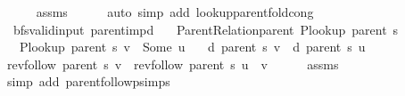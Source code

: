 \begin{isabellebody}
\ \ \ \ \isamarkupfalse%
\ assms\isanewline
\ \ \ \ \isamarkupfalse%
\ {\isacharparenleft}{\kern0pt}auto\ simp\ add{\isacharcolon}{\kern0pt}\ lookup{\isacharunderscore}{\kern0pt}parent{\isacharunderscore}{\kern0pt}fold{\isacharunderscore}{\kern0pt}cong{\isacharparenright}{\kern0pt}\isanewline
{}\isamarkupfalse%
%
\endisatagproof
{\isafoldproof}%
%
\isadelimproof
\isanewline
%
\endisadelimproof
%
\isadeliminvisible
\isanewline
%
\endisadeliminvisible
%
\isataginvisible
{}\isamarkupfalse%
\ {\isacharparenleft}{\kern0pt}\ bfs{\isacharunderscore}{\kern0pt}valid{\isacharunderscore}{\kern0pt}input{\isacharparenright}{\kern0pt}\ parent{\isacharunderscore}{\kern0pt}imp{\isacharunderscore}{\kern0pt}d{\isacharcolon}{\kern0pt}\isanewline
\ \ \ {\isachardoublequoteopen}Parent{\isacharunderscore}{\kern0pt}Relation{\isachardot}{\kern0pt}parent\ {\isacharparenleft}{\kern0pt}P{\isacharunderscore}{\kern0pt}lookup\ {\isacharparenleft}{\kern0pt}parent\ s{\isacharparenright}{\kern0pt}{\isacharparenright}{\kern0pt}{\isachardoublequoteclose}\isanewline
\ \ \ {\isachardoublequoteopen}P{\isacharunderscore}{\kern0pt}lookup\ {\isacharparenleft}{\kern0pt}parent\ s{\isacharparenright}{\kern0pt}\ v\ {\isacharequal}{\kern0pt}\ Some\ u{\isachardoublequoteclose}\isanewline
\ \ \ {\isachardoublequoteopen}d\ {\isacharparenleft}{\kern0pt}parent\ s{\isacharparenright}{\kern0pt}\ v\ {\isacharequal}{\kern0pt}\ d\ {\isacharparenleft}{\kern0pt}parent\ s{\isacharparenright}{\kern0pt}\ u\ {\isacharplus}{\kern0pt}\ {}{\isachardoublequoteclose}%
\endisataginvisible
{\isafoldinvisible}%
%
\isadeliminvisible
\isanewline
%
\endisadeliminvisible
%
\isadelimproof
%
\endisadelimproof
%
\isatagproof
{}\isamarkupfalse%
\ {\isacharminus}{\kern0pt}\isanewline
\ \ \isamarkupfalse%
\ {\isachardoublequoteopen}rev{\isacharunderscore}{\kern0pt}follow\ {\isacharparenleft}{\kern0pt}parent\ s{\isacharparenright}{\kern0pt}\ v\ {\isacharequal}{\kern0pt}\ rev{\isacharunderscore}{\kern0pt}follow\ {\isacharparenleft}{\kern0pt}parent\ s{\isacharparenright}{\kern0pt}\ u\ {\isacharat}{\kern0pt}\ {\isacharbrackleft}{\kern0pt}v{\isacharbrackright}{\kern0pt}{\isachardoublequoteclose}\isanewline
\ \ \ \ \isamarkupfalse%
\ assms\isanewline
\ \ \ \ \isamarkupfalse%
\ {\isacharparenleft}{\kern0pt}simp\ add{\isacharcolon}{\kern0pt}\ parent{\isachardot}{\kern0pt}follow{\isacharunderscore}{\kern0pt}psimps{\isacharparenright}{\kern0pt}\isanewline

\end{isabellebody}
